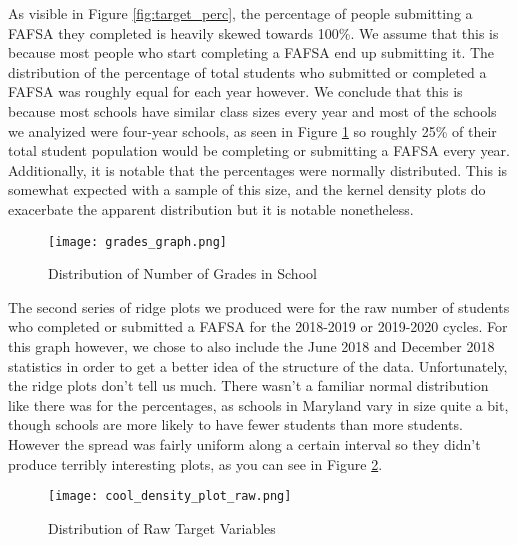 \documentclass[12pt]{article}
\begin{document}
As visible in Figure \ref{fig:target_perc}, the percentage of people submitting a 
FAFSA they completed is heavily skewed towards 100\%. We assume that this is 
because most people who start completing a FAFSA end up submitting it. The distribution
of the percentage of total students who submitted or completed a FAFSA was roughly
equal for each year however. We conclude that this is because most schools have similar
class sizes every year and most of the schools we analyized were four-year schools, 
as seen in Figure \ref{fig:grades} so roughly 25\% of their total student population would be 
completing or submitting a FAFSA every year. Additionally, it is notable that the percentages 
were normally distributed. This is somewhat expected with a sample of this size, and the 
kernel density plots do exacerbate the apparent distribution but it is notable nonetheless.\\

\begin{figure}[!htb]
  \centering
  \texttt{[image: grades\_graph.png]}
  \caption{Distribution of Number of Grades in School}
  \label{fig:grades}
\end{figure}

The second series of ridge plots we produced were for the raw number of students
who completed or submitted a FAFSA for the 2018-2019 or 2019-2020 cycles. For this
graph however, we chose to also include the June 2018 and December 2018 statistics
in order to get a better idea of the structure of the data. Unfortunately, the ridge
plots don't tell us much. There wasn't a familiar normal distribution like there was
for the percentages, as schools in Maryland vary in size quite a bit, though schools
are more likely to have fewer students than more students. However the spread was
fairly uniform along a certain interval so they didn't produce terribly interesting
plots, as you can see in Figure \ref{fig:target_raw}.

\begin{figure}[!htb]
  \centering
  \texttt{[image: cool\_density\_plot\_raw.png]}
  \caption{Distribution of Raw Target Variables}
  \label{fig:target_raw}
\end{figure}
\end{document}
